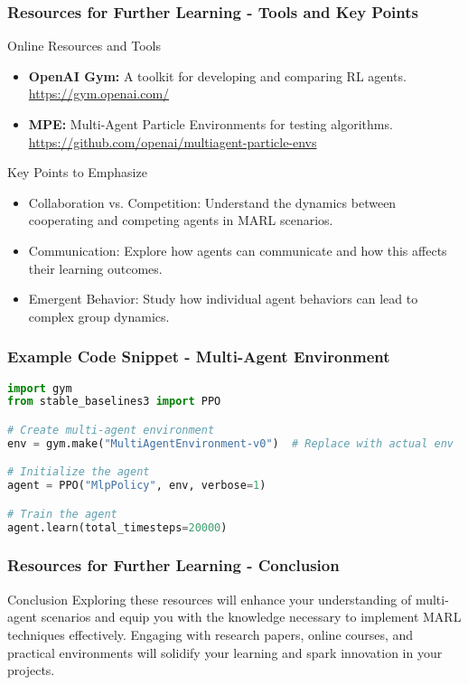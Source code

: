 \documentclass[aspectratio=169]{beamer}
\begin{document}
\begin{frame}[fragile]
    \frametitle{Resources for Further Learning - Tools and Key Points}
    \begin{block}{Online Resources and Tools}
    \begin{itemize}
        \item \textbf{OpenAI Gym:} A toolkit for developing and comparing RL agents. \url{https://gym.openai.com/}
        \item \textbf{MPE:} Multi-Agent Particle Environments for testing algorithms. \url{https://github.com/openai/multiagent-particle-envs}
    \end{itemize}
    \end{block}

    \begin{block}{Key Points to Emphasize}
    \begin{itemize}
        \item Collaboration vs. Competition: Understand the dynamics between cooperating and competing agents in MARL scenarios.
        \item Communication: Explore how agents can communicate and how this affects their learning outcomes.
        \item Emergent Behavior: Study how individual agent behaviors can lead to complex group dynamics.
    \end{itemize}
    \end{block}
\end{frame}

\begin{frame}[fragile]
    \frametitle{Example Code Snippet - Multi-Agent Environment}
    \begin{lstlisting}[language=Python]
import gym
from stable_baselines3 import PPO

# Create multi-agent environment
env = gym.make("MultiAgentEnvironment-v0")  # Replace with actual env

# Initialize the agent
agent = PPO("MlpPolicy", env, verbose=1)

# Train the agent
agent.learn(total_timesteps=20000)
    \end{lstlisting}
\end{frame}

\begin{frame}[fragile]
    \frametitle{Resources for Further Learning - Conclusion}
    \begin{block}{Conclusion}
    Exploring these resources will enhance your understanding of multi-agent scenarios and equip you with the knowledge necessary to implement MARL techniques effectively. Engaging with research papers, online courses, and practical environments will solidify your learning and spark innovation in your projects.
    \end{block}
\end{frame}
\end{document}
